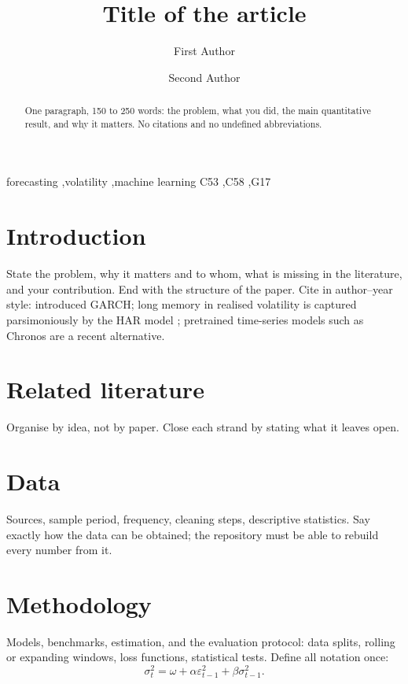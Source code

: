 \documentclass[preprint,12pt,authoryear]{elsarticle}
\begin{document}
\begin{frontmatter}

\title{Title of the article}

\author[wne]{First Author}
\author[wne]{Second Author}

\begin{abstract}
One paragraph, 150 to 250 words: the problem, what you did, the main quantitative result, and
why it matters. No citations and no undefined abbreviations.
\end{abstract}

\begin{keyword}
forecasting \sep volatility \sep machine learning
\JEL C53 \sep C58 \sep G17
\end{keyword}

\end{frontmatter}

\section{Introduction}
State the problem, why it matters and to whom, what is missing in the literature, and your
contribution. End with the structure of the paper. Cite in author--year style:
\citet{bollerslev1986garch} introduced GARCH; long memory in realised volatility is captured
parsimoniously by the HAR model \citep{corsi2009har}; pretrained time-series models such as
Chronos \citep{ansari2024chronos} are a recent alternative.

\section{Related literature}
Organise by idea, not by paper. Close each strand by stating what it leaves open.

\section{Data}
Sources, sample period, frequency, cleaning steps, descriptive statistics. Say exactly how the
data can be obtained; the repository must be able to rebuild every number from it.

\section{Methodology}
Models, benchmarks, estimation, and the evaluation protocol: data splits, rolling or expanding
windows, loss functions, statistical tests. Define all notation once:
\begin{equation}
  \sigma_t^2 = \omega + \alpha \varepsilon_{t-1}^2 + \beta \sigma_{t-1}^2 .
  \label{eq:garch}
\end{equation}
\end{document}
